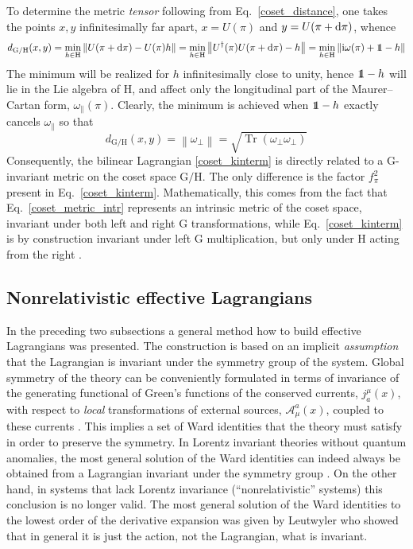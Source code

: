 \documentclass[final,2p,times,12pt,sort&compress]{elsarticle}
\newcommand\gr[1]{\mathrm{#1}}              %
\newcommand\AAA{\mathscr{A}}                %
\newcommand\he[1]{#1^{\dagger}}             %
\newcommand\imag{\mathrm i}                 %
\DeclareRobustCommand\openone{\leavevmode\hbox{\small1\normalsize\kern-.33em1}}
\newcommand\nor[1]{\left\|#1\right\|}       %
\newcommand\dd{\mathop{{\rm d}\!}\nolimits} %
\DeclareMathOperator{\Tr}{Tr}
\begin{document}
To determine the metric \emph{tensor} following from
Eq.~\eqref{coset_distance}, one takes the points $x,y$ infinitesimally far
apart, $x=U(\pi)$ and $y=U(\pi+\dd\pi)$, whence
\begin{equation}
d_{\gr{G/H}}(x,y)=\min_{h\in\gr H}\nor{U(\pi+\dd\pi)-U(\pi)h}=
\min_{h\in\gr H}\nor{\he U(\pi)U(\pi+\dd\pi)-h}=
\min_{h\in\gr H}\nor{\imag\omega(\pi)+\openone-h}
\end{equation}
The minimum will be realized for $h$ infinitesimally close to unity, hence
$\openone-h$ will lie in the Lie algebra of $\gr H$, and affect only the
longitudinal part of the Maurer--Cartan form, $\omega_\parallel(\pi)$. Clearly,
the minimum is achieved when $\openone-h$ exactly cancels
$\omega_\parallel$ so that
\begin{equation}
d_{\gr{G/H}}(x,y)=\nor{\omega_\perp}=\sqrt{\Tr(\omega_\perp\omega_\perp)}
\label{coset_metric_intr}
\end{equation}
Consequently, the bilinear Lagrangian \eqref{coset_kinterm} is directly related
to a $\gr G$-invariant metric on the coset space $\gr{G/H}$. The only
difference is the factor $f_\pi^2$ present in Eq.~\eqref{coset_kinterm}.
Mathematically, this comes from the fact that Eq.~\eqref{coset_metric_intr}
represents an intrinsic metric of the coset space, invariant under both left
and right $\gr G$ transformations, while Eq.~\eqref{coset_kinterm} is by
construction invariant under left $\gr G$ multiplication, but only under $\gr
H$ acting from the right \cite{Leutwyler:1993iq}.


\subsection{Nonrelativistic effective Lagrangians}
In the preceding two subsections a general method how to build effective
Lagrangians was presented. The construction is based on an implicit
\emph{assumption} that the Lagrangian is invariant under the symmetry group of
the system. Global symmetry of the theory can be conveniently formulated in
terms of invariance of the generating functional of Green's functions of the
conserved currents, $j^\mu_a(x)$, with respect to \emph{local} transformations
of external sources, $\AAA^a_\mu(x)$, coupled to these currents
\cite{Gasser:1983yg,Gasser:1984gg}. This implies a set of Ward identities that
the theory must satisfy in order to preserve the symmetry. In Lorentz
invariant theories without quantum anomalies, the most general solution of the
Ward identities can indeed always be obtained from a Lagrangian invariant under
the symmetry group \cite{Leutwyler:1993iq}. On the other hand, in systems that
lack Lorentz invariance (``nonrelativistic'' systems) this conclusion is no
longer valid. The most general solution of the Ward identities to the lowest
order of the derivative expansion was given by Leutwyler \cite{Leutwyler:1993gf}
who showed that in general it is just the action, not the Lagrangian, what is
invariant.
\end{document}
